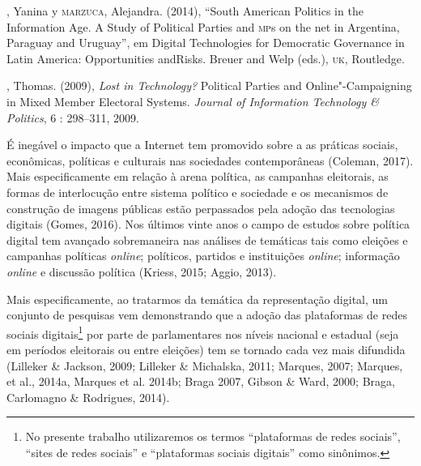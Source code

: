 \begin{bibliohedra}
, Yanina y \textsc{marzuca}, Alejandra. (2014), ``South American Politics in
the Information Age. A Study of Political Parties and \textsc{mp}s on the net in
Argentina, Paraguay and Uruguay'', em Digital Technologies for
Democratic Governance in Latin America: Opportunities andRisks. Breuer
and Welp (eds.), \textsc{uk}, Routledge.

, Thomas. (2009), \emph{Lost in Technology?} Political Parties and
Online"-Campaigning in Mixed Member Electoral Systems. \emph{Journal of
Information Technology \& Politics}, 6 : 298--311, 2009.
\end{bibliohedra}




\noindent{}É inegável o impacto que a Internet tem promovido sobre a as práticas
sociais, econômicas, políticas e culturais nas sociedades contemporâneas
(Coleman, 2017). Mais especificamente em relação à arena política, as
campanhas eleitorais, as formas de interlocução entre sistema político e
sociedade e os mecanismos de construção de imagens públicas estão
perpassados pela adoção das tecnologias digitais (Gomes, 2016). Nos
últimos vinte anos o campo de estudos sobre política digital tem
avançado sobremaneira nas análises de temáticas tais como eleições e
campanhas políticas \emph{online}; políticos, partidos e instituições \emph{online};
informação \emph{online} e discussão política (Kriess, 2015; Aggio, 2013).

Mais especificamente, ao tratarmos da temática da representação digital,
um conjunto de pesquisas vem demonstrando que a adoção das plataformas
de redes sociais digitais\footnote{No presente trabalho utilizaremos os
  termos ``plataformas de redes sociais'', ``sites de redes sociais'' e
  ``plataformas sociais digitais'' como sinônimos.} por parte de
parlamentares nos níveis nacional e estadual (seja em períodos
eleitorais ou entre eleições) tem se tornado cada vez mais difundida
(Lilleker \& Jackson, 2009; Lilleker \& Michalska, 2011; Marques, 2007;
Marques, et al., 2014a, Marques et al. 2014b; Braga 2007, Gibson \&
Ward, 2000; Braga, Carlomagno \& Rodrigues, 2014).

